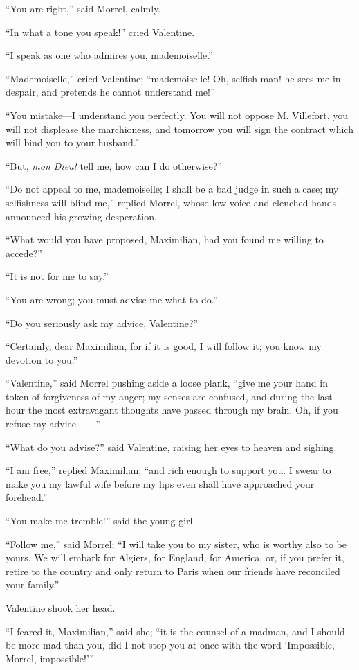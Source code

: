 “You are right,” said Morrel, calmly.

“In what a tone you speak!” cried Valentine.

“I speak as one who admires you, mademoiselle.”

“Mademoiselle,” cried Valentine; “mademoiselle! Oh, selfish man! he
sees me in despair, and pretends he cannot understand me!”

“You mistake—I understand you perfectly. You will not oppose M.
Villefort, you will not displease the marchioness, and tomorrow you
will sign the contract which will bind you to your husband.”

“But, \textit{mon Dieu!} tell me, how can I do otherwise?”

“Do not appeal to me, mademoiselle; I shall be a bad judge in such a
case; my selfishness will blind me,” replied Morrel, whose low voice
and clenched hands announced his growing desperation.

“What would you have proposed, Maximilian, had you found me willing to
accede?”

“It is not for me to say.”

“You are wrong; you must advise me what to do.”

“Do you seriously ask my advice, Valentine?”

“Certainly, dear Maximilian, for if it is good, I will follow it; you
know my devotion to you.”

“Valentine,” said Morrel pushing aside a loose plank, “give me your
hand in token of forgiveness of my anger; my senses are confused, and
during the last hour the most extravagant thoughts have passed through
my brain. Oh, if you refuse my advice——”

“What do you advise?” said Valentine, raising her eyes to heaven and
sighing.

“I am free,” replied Maximilian, “and rich enough to support you. I
swear to make you my lawful wife before my lips even shall have
approached your forehead.”

“You make me tremble!” said the young girl.

“Follow me,” said Morrel; “I will take you to my sister, who is worthy
also to be yours. We will embark for Algiers, for England, for America,
or, if you prefer it, retire to the country and only return to Paris
when our friends have reconciled your family.”

Valentine shook her head.

“I feared it, Maximilian,” said she; “it is the counsel of a madman,
and I should be more mad than you, did I not stop you at once with the
word ‘Impossible, Morrel, impossible!’”

